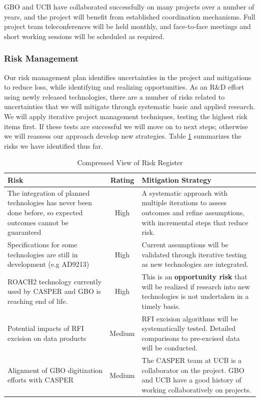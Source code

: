 \documentclass[10pt]{myNSF}
\begin{document}
GBO and UCB have collaborated successfully on many projects
over a number of years, and the project will benefit from established
coordination mechanisms. Full project team teleconferences will be
held monthly, and face-to-face meetings and short working sessions
will be scheduled as required.

\subsubsection{Risk Management}
\label{sec:risk_management}

Our risk management plan identifies uncertainties in the project and
mitigations to reduce loss, while identifying and realizing
opportunities. As an R\&D effort using newly released technologies,
there are a number of risks related to uncertainties that we will
mitigate through systematic basic and applied research.  We will apply
iterative project management techniques, testing the highest risk
items first.  If these tests are successful we will move on to next
steps; otherwise we will reassess our approach develop new strategies.
Table \ref{table:risk_register} summarizes the risks we have
identified thus far.

\begin{table}[t]
  \centering
  \caption{Compressed View of Risk Register \label{table:risk_register}}
  \begin{tabular}{|p{2.75in}|c|p{2.75in}|}
    \hline
    Risk & Rating & Mitigation Strategy \\
    \hline
    The integration of planned technologies has never been done before, so expected outcomes cannot be guaranteed & High & A systematic approach with multiple iterations to assess outcomes and refine assumptions, with incremental steps that reduce risk. \\
    \hline
    Specifications for some technologies are still in development (e.g AD9213) & High & Current assumptions will be validated through iterative testing as new technologies are integrated. \\
    \hline
    ROACH2 technology currently used by CASPER and GBO is reaching end of life. & High & This is an \textbf{opportunity risk} that will be realized if research into new technologies is not undertaken in a timely basis. \\
    \hline
    Potential impacts of RFI excision on data products & Medium & RFI excision algorithms will be systematically tested.  Detailed comparisons to pre-excised data will be conducted. \\
    \hline
    Alignment of GBO digitization efforts with CASPER & Medium & The CASPER team at UCB is a collaborator on the project.  GBO and UCB have a good history of working collaboratively on projects. \\
    \hline
  \end{tabular}
\end{table}
\end{document}

